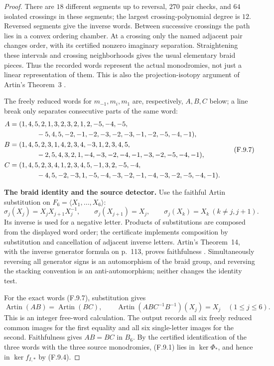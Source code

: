 \begin{proof}
There are $18$ different segments up to reversal,
$270$ pair checks, and $64$ isolated crossings in
these segments; the largest crossing-polynomial
degree is $12$.  Reversed segments give the inverse
words.  Between successive crossings the path lies
in a convex ordering chamber.  At a crossing only
the named adjacent pair changes order, with its
certified nonzero imaginary separation.  Straightening
these intervals and crossing neighborhoods gives the
usual elementary braid pieces.  Thus the recorded
words represent the actual monodromies, not just a
linear representation of them.  This is also the
projection-isotopy argument of Artin's Theorem~3
\cite{A-Artin1947}.

The freely reduced words for $m_{-1},m_i,m_1$ are,
respectively, $A,B,C$ below; a line break only separates
consecutive parts of the same word:
\[
\begin{aligned}
 A={}&(1,4,5,2,1,3,2,3,2,1,2,-5,-4,-5,\\
     &\hspace{9mm}-5,4,5,-2,-1,-2,-3,-2,-3,-1,-2,-5,-4,-1),\\
 B={}&(1,4,5,2,3,1,4,2,3,4,-3,1,2,3,4,5,\\
     &\hspace{9mm}-2,5,4,3,2,1,-4,-3,-2,-4,-1,-3,-2,-5,-4,-1),\\
 C={}&(1,4,5,2,3,4,1,2,3,4,5,-1,3,2,-5,-4,\\
     &\hspace{9mm}-4,5,-2,-3,1,-5,-4,-3,-2,-1,-4,-3,-2,-5,-4,-1).
\end{aligned}                                                   \tag{F.9.7}
\]

\textbf{The braid identity and the source detector.}
Use the faithful Artin substitution on
$F_6=\langle X_1,\ldots,X_6\rangle$:
\[
 \sigma_j(X_j)=X_jX_{j+1}X_j^{-1},\qquad
 \sigma_j(X_{j+1})=X_j,
 \qquad \sigma_j(X_k)=X_k\ (k\ne j,j+1).              \tag{F.9.8}
\]
Its inverse is used for a negative letter.  Products
of substitutions are composed from the displayed
word order; the certificate implements composition
by substitution and cancellation of adjacent inverse
letters.  Artin's Theorem~14, with the inverse
generator formula on p.~113, proves faithfulness
\cite{A-Artin1947}.  Simultaneously reversing all
generator signs is an automorphism of the braid
group, and reversing the stacking convention is an
anti-automorphism; neither changes the identity test.

For the exact words (F.9.7), substitution gives
\[
       \operatorname{Artin}(AB)=\operatorname{Artin}(BC),
 \qquad
       \operatorname{Artin}(ABC^{-1}B^{-1})(X_j)=X_j
       \quad(1\le j\le6).                              \tag{F.9.9}
\]
This is an integer free-word calculation.  The output
records all six freely reduced common images for the
first equality and all six single-letter images for
the second.  Faithfulness gives
$AB=BC$ in $B_6$.  By the certified identification of
the three words with the three source monodromies,
(F.9.1) lies in $\ker\Phi_*$, and hence in
$\ker f_{I,*}$ by (F.9.4).


\end{proof}
